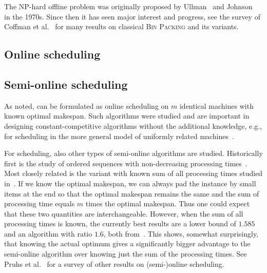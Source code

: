 The NP-hard offline problem \binpacking was originally proposed by
Ullman~\cite{ullman71} and Johnson~\cite{johnson73} in the
1970s. Since then it has seen major interest and progress, see the
survey of Coffman et al.~\cite{coffman13} for many results on
classical \textsc{Bin Packing} and its variants. 

\subsection{Online scheduling}


\subsection{Semi-online scheduling}

As noted, \binstretch can be formulated as online scheduling on
$m$ identical machines with known optimal makespan. Such algorithms
were studied and are important in designing constant-competitive
algorithms without the additional knowledge, e.g., for scheduling in
the more general model of uniformly related
machines~\cite{AsAFPW97,BeChKa00,EbJaSg09}.

For scheduling, also other types of semi-online algorithms are
studied. Historically first is the study of ordered sequences with
non-decreasing processing times~\cite{Graham69}. Most closely related
is the variant with known sum of all processing times studied
in~\cite{KeKoST97}. If we know the optimal makespan, we can always pad
the instance by small items at the end so that the optimal makespan
remains the same and the sum of processing time equals $m$ times the
optimal makespan. Thus one could expect that these two quantities are
interchangeable. However, when the sum of all processing times is
known, the currently best results are a lower bound of $1.585$ and an
algorithm with ratio $1.6$, both
from~\cite{DBLP:journals/tcs/AlbersH12}. This shows, somewhat
surprisingly, that knowing the actual optimum gives a significantly
bigger advantage to the semi-online algorithm over knowing just the
sum of the processing times. See Pruhs et al.~\cite{PST04} for a
survey of other results on (semi-)online scheduling.



